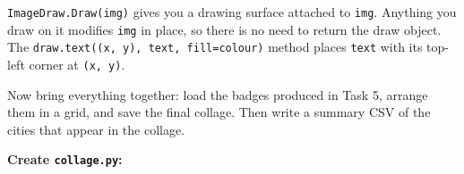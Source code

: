 \documentclass{cslab}
\begin{document}
\begin{note}
\texttt{ImageDraw.Draw(img)} gives you a drawing surface attached to \texttt{img}.
Anything you draw on it modifies \texttt{img} in place, so there is no need to return
the draw object.  The \texttt{draw.text((x, y), text, fill=colour)} method places
\texttt{text} with its top-left corner at \texttt{(x, y)}.
\end{note}


Now bring everything together: load the badges produced in Task 5, arrange them in a
grid, and save the final collage.  Then write a summary CSV of the cities that appear
in the collage.

\textbf{Create \texttt{collage.py}:}
\end{document}
